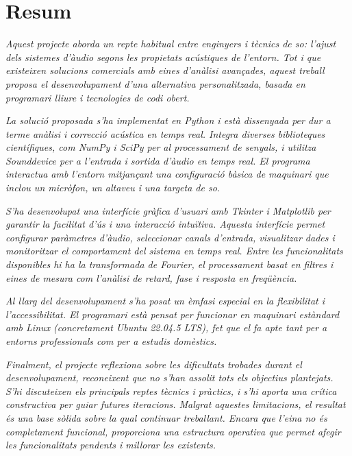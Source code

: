 \vspace{1em}

\let\origclearpage\clearpage
\let\clearpage\relax
\chapter*{Resum}

\textit{Aquest projecte aborda un repte habitual entre enginyers i tècnics de so: l'ajust dels sistemes d'àudio segons les propietats acústiques de l'entorn. Tot i que existeixen solucions comercials amb eines d'anàlisi avançades, aquest treball proposa el desenvolupament d’una alternativa personalitzada, basada en programari lliure i tecnologies de codi obert.}

\textit{La solució proposada s'ha implementat en Python i està dissenyada per dur a terme anàlisi i correcció acústica en temps real. Integra diverses biblioteques científiques, com NumPy i SciPy per al processament de senyals, i utilitza Sounddevice per a l’entrada i sortida d’àudio en temps real. El programa interactua amb l'entorn mitjançant una configuració bàsica de maquinari que inclou un micròfon, un altaveu i una targeta de so.}

\textit{S'ha desenvolupat una interfície gràfica d'usuari amb Tkinter i Matplotlib per garantir la facilitat d’ús i una interacció intuïtiva. Aquesta interfície permet configurar paràmetres d’àudio, seleccionar canals d’entrada, visualitzar dades i monitoritzar el comportament del sistema en temps real. Entre les funcionalitats disponibles hi ha la transformada de Fourier, el processament basat en filtres i eines de mesura com l’anàlisi de retard, fase i resposta en freqüència.}

\textit{Al llarg del desenvolupament s’ha posat un èmfasi especial en la flexibilitat i l’accessibilitat. El programari està pensat per funcionar en maquinari estàndard amb Linux (concretament Ubuntu 22.04.5 LTS), fet que el fa apte tant per a entorns professionals com per a estudis domèstics.}

\textit{Finalment, el projecte reflexiona sobre les dificultats trobades durant el desenvolupament, reconeixent que no s’han assolit tots els objectius plantejats. S’hi discuteixen els principals reptes tècnics i pràctics, i s’hi aporta una crítica constructiva per guiar futures iteracions. Malgrat aquestes limitacions, el resultat és una base sòlida sobre la qual continuar treballant. Encara que l’eina no és completament funcional, proporciona una estructura operativa que permet afegir les funcionalitats pendents i millorar les existents.}

\let\clearpage\origclearpage